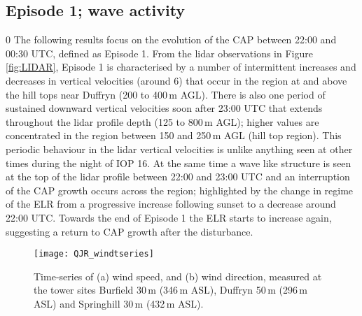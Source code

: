 \documentclass[times]{qjrms4}
\begin{document}
\subsection{Episode 1; wave activity}
\label{ep1}0
The following results focus on the evolution of the CAP between 22:00 and 00:30 UTC, defined as Episode 1. From the lidar observations in Figure \ref{fig:LIDAR}, Episode 1 is characterised by a number of intermittent increases and decreases in vertical velocities (around 6) that occur in the region at and above the hill tops near Duffryn (200 to 400$\,\mbox{m}$ AGL). There is also one period of sustained downward vertical velocities soon after 23:00 UTC that extends throughout the lidar profile depth (125 to 800$\,\mbox{m}$ AGL); higher values are concentrated in the region between 150 and 250$\,\mbox{m}$ AGL (hill top region). This periodic behaviour in the lidar vertical velocities is unlike anything seen at other times during the night of IOP 16. At the same time a wave like structure is seen at the top of the lidar profile between 22:00 and 23:00 UTC and an interruption of the CAP growth occurs across the region; highlighted by the change in regime of the ELR from a progressive increase following sunset to a decrease around 22:00 UTC. Towards the end of Episode 1 the ELR starts to increase again, suggesting a return to CAP growth after the disturbance.
%
       \begin{figure*}
        \centering
        \texttt{[image: QJR\_windtseries]}
        \caption{Time-series of (a) wind speed, and (b) wind direction, measured at the tower sites Burfield 30$\,\mbox{m}$ (346$\,\mbox{m}$ ASL), Duffryn 50$\,\mbox{m}$ (296$\,\mbox{m}$ ASL) and Springhill 30$\,\mbox{m}$ (432$\,\mbox{m}$ ASL).}
        \label{fig:windtseries}
        \end{figure*}
        
\end{document}
